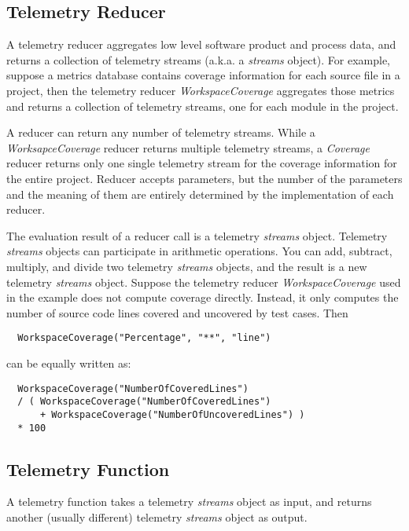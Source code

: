 \subsection{Telemetry Reducer}

A telemetry reducer aggregates low level software product and process data, and returns a collection of telemetry streams (a.k.a. a \textit{streams} object). For example, suppose a metrics database contains coverage information for each source file in a project, then the telemetry reducer \textit{WorkspaceCoverage} aggregates those metrics and returns a collection of telemetry streams, one for each module in the project.

A reducer can return any number of telemetry streams. While a
\textit{WorksapceCoverage} reducer returns multiple telemetry streams, a \textit{Coverage} reducer returns only one single telemetry stream for the coverage information for the entire project. Reducer accepts parameters, but the number of the parameters and the meaning of them are entirely determined by the implementation of each reducer.

The evaluation result of a reducer call is a telemetry \textit{streams} object. Telemetry \textit{streams} objects can participate in arithmetic operations. You can add, subtract, multiply, and divide two telemetry \textit{streams} objects, and the result is a new telemetry \textit{streams} object. Suppose the telemetry reducer \textit{WorkspaceCoverage} used in the example does not compute coverage directly. Instead, it only computes the number of source code lines covered and uncovered by test cases. Then 

\begin{verbatim}
  WorkspaceCoverage("Percentage", "**", "line")
\end{verbatim}

can be equally written as:

\begin{verbatim}
  WorkspaceCoverage("NumberOfCoveredLines") 
  / ( WorkspaceCoverage("NumberOfCoveredLines") 
      + WorkspaceCoverage("NumberOfUncoveredLines") )
  * 100
\end{verbatim}


\subsection{Telemetry Function}

A telemetry function takes a telemetry \textit{streams} object as input, and returns another (usually different) telemetry \textit{streams} object as output.


